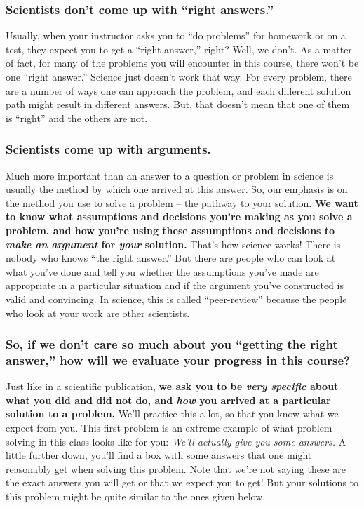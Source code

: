 \label{fnt1.1.1-1}
\subsubsection*{Scientists don't come up with ``right answers.''}

Usually, when your instructor asks you to ``do problems'' for homework or on a test, they expect you to get a ``right answer,'' right? Well, we don't. As a matter of fact, for many of the problems you will encounter in this course, there won't be one ``right answer.'' Science just doesn't work that way. For every problem, there are a number of ways one can approach the problem, and each different solution path might result in different answers. But, that doesn't mean that one of them is ``right'' and the others are not.

\subsubsection*{Scientists come up with arguments.}

Much more important than an answer to a question or problem in science is usually the method by which one arrived at this answer. So, our emphasis is on the method you use to solve a problem -- the pathway to your solution. \textbf{We want to know what assumptions and decisions you're making as you solve a problem, and how you're using these assumptions and decisions to \emph{make an argument} for \emph{your} solution.} That's how science works! There is nobody who knows ``the right answer.'' But there are people who can look at what you've done and tell you whether the assumptions you've made are appropriate in a particular situation and if the argument you've constructed is valid and convincing. In science, this is called ``peer-review'' because the people who look at your work are other scientists.

\subsubsection*{So, if we don't care so much about you ``getting the right answer,'' how will we evaluate your progress in this course?}

Just like in a scientific publication, \textbf{we ask you to be \emph{very specific} about what you did and did not do, and \emph{how} you arrived at a particular solution to a problem.} We'll practice this a lot, so that you know what we expect from you. This first problem is an extreme example of what problem-solving in this class looks like for you: \emph{We'll actually give you some answers.} A little further down, you'll find a box with some answers that one might reasonably get when solving this problem. Note that we're not saying these are the exact answers you will get or that we expect you to get! But your solutions to this problem might be quite similar to the ones given below.

